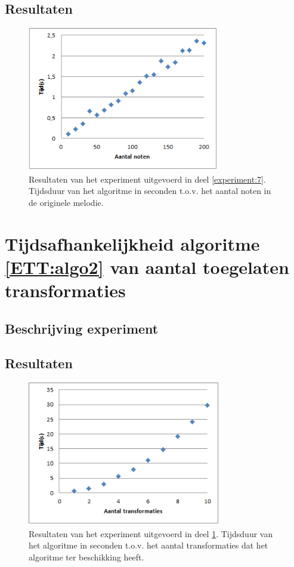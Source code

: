 \subsection{Resultaten}
\begin{figure}[!ht]
  \centering
  \includegraphics[width=0.75\textwidth]{5_Experimenten_Resultaten/exp7_res}
  \caption{Resultaten van het experiment uitgevoerd in deel \ref{experiment:7}. Tijdsduur van het algoritme in seconden t.o.v. het aantal noten in de originele melodie.}
  \label{figuur:exp7}
\end{figure}

\section{Tijdsafhankelijkheid algoritme \ref{ETT:algo2} van aantal toegelaten transformaties}
\label{experiment:8}
\subsection{Beschrijving experiment}

\subsection{Resultaten}
\begin{figure}[!ht]
  \centering
  \includegraphics[width=0.75\textwidth]{5_Experimenten_Resultaten/exp8_res}
  \caption{Resultaten van het experiment uitgevoerd in deel \ref{experiment:8}. Tijdsduur van het algoritme in seconden t.o.v. het aantal transformaties dat het algoritme ter beschikking heeft.}
  \label{figuur:exp8}
\end{figure}


